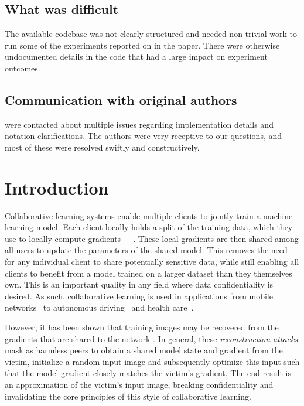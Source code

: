\subsection{What was difficult}

The available codebase was not clearly structured and needed non-trivial work to run some of the experiments reported on in the paper. There were otherwise undocumented details in the code that had a large impact on experiment outcomes.

\subsection*{Communication with original authors}

\citet{gao2021privacy} were contacted about multiple issues regarding implementation details and notation clarifications. The authors were very receptive to our questions, and most of these were resolved swiftly and constructively.

\newpage


\section{Introduction}
\label{sec:intro}

Collaborative learning systems enable multiple clients to jointly train a machine learning model. Each client locally holds a split of the training data, which they use to locally compute gradients~\cite{yang2019federated}~\cite{guo2020towards}~\cite{melis2019exploiting}. These local gradients are then shared among all users to update the parameters of the shared model. This removes the need for any individual client to share potentially sensitive data, while still enabling all clients to benefit from a model trained on a larger dataset than they themselves own. This is an important quality in any field where data confidentiality is desired. As such, collaborative learning is used in applications from mobile networks~\cite{kang2019} to autonomous driving~\cite{niknam2020federated} and health care~\cite{brisimi2018federated}.

However, it has been shown that training images may be recovered from the gradients that are shared to the network \cite{geiping2020inverting}\cite{zhao2020idlg}\cite{zhu2019}. In general, these \emph{reconstruction attacks} mask as harmless peers to obtain a shared model state and gradient from the victim, initialize a random input image and subsequently optimize this input such that the model gradient closely matches the victim's gradient. The end result is an approximation of the victim's input image, breaking confidentiality and invalidating the core principles of this style of collaborative learning.

